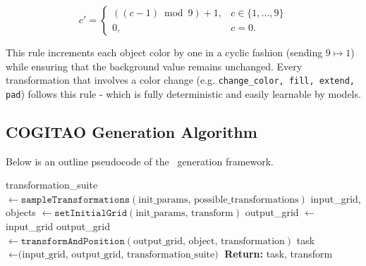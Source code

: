 $$
c' =
\begin{cases}
((c - 1) \bmod 9) + 1, & c \in \{1,\dots,9\} \\
0, & c = 0 .
\end{cases}
$$

This rule increments each object color by one in a cyclic fashion (sending $9 \mapsto 1$) while ensuring that the background value remains unchanged. Every transformation that involves a color change (e.g. \texttt{change\_color, fill, extend, pad}) follows this rule - which is fully deterministic and easily learnable by models.


\subsection{COGITAO Generation Algorithm}\label{appendix:COGITAO_generation}

Below is an outline pseudocode of the \generatorName\ generation framework.  

\begin{algorithm}
    \caption{\texttt{GenerateCogitaoTask(init\_params)} - Below is a simplified pseudo-code for the general algorithmic logic of the \texttt{\generatorName} generator: Generator}
    \label{before-arc-algorithm}
    \begin{algorithmic}[1] %
            \State transformation\_suite $\gets \texttt{sampleTransformations}(\text{init\_params, possible\_transformations})$
            \EndFor
            \State input\_grid, objects $\gets \texttt{setInitialGrid}(\text{init\_params, transform})$
            \State output\_grid $\gets$ input\_grid
                    \State output\_grid $\gets \texttt{transformAndPosition}(\text{output\_grid, object, transformation})$
                \EndFor
            \EndFor
            \State task $\gets \text{(input\_grid, output\_grid, transformation\_suite)}$
        \EndWhile
        \State \textbf{Return:} task, transform 
    \end{algorithmic}
\end{algorithm}

